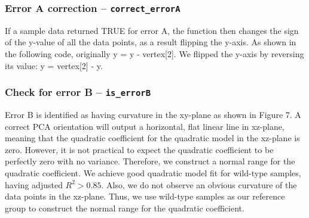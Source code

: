 \documentclass[10pt,letterpaper]{article}
\newenvironment{Shaded}{\begin{snugshade}}{\end{snugshade}}
\newcommand{\ControlFlowTok}[1]{\textcolor[rgb]{0.13,0.29,0.53}{\textbf{#1}}}
\newcommand{\DataTypeTok}[1]{\textcolor[rgb]{0.13,0.29,0.53}{#1}}
\newcommand{\DecValTok}[1]{\textcolor[rgb]{0.00,0.00,0.81}{#1}}
\newcommand{\KeywordTok}[1]{\textcolor[rgb]{0.13,0.29,0.53}{\textbf{#1}}}
\newcommand{\NormalTok}[1]{#1}
\newcommand{\OperatorTok}[1]{\textcolor[rgb]{0.81,0.36,0.00}{\textbf{#1}}}
\newcommand{\OtherTok}[1]{\textcolor[rgb]{0.56,0.35,0.01}{#1}}
\newcommand{\StringTok}[1]{\textcolor[rgb]{0.31,0.60,0.02}{#1}}
\begin{document}
\hypertarget{error-a-correction-correct_errora}{%
\subsubsection{\texorpdfstring{Error A correction --
\texttt{correct\_errorA}}{Error A correction -- correct\_errorA}}\label{error-a-correction-correct_errora}}

If a sample data returned TRUE for error A, the function then changes
the sign of the y-value of all the data points, as a result flipping the
y-axis. As shown in the following code, originally y = y -
vertex{[}2{]}. We flipped the y-axis by reversing its value: y =
vertex{[}2{]} - y.

\begin{Shaded}
\end{Shaded}

\hypertarget{check-for-error-b-is_errorb}{%
\subsubsection{\texorpdfstring{Check for error B --
\texttt{is\_errorB}}{Check for error B -- is\_errorB}}\label{check-for-error-b-is_errorb}}

Error B is identified as having curvature in the xy-plane as shown in
Figure 7. A correct PCA orientation will output a horizontal, flat
linear line in xz-plane, meaning that the quadratic coefficient for the
quadratic model in the xz-plane is zero. However, it is not practical to
expect the quadratic coefficient to be perfectly zero with no variance.
Therefore, we construct a normal range for the quadratic coefficient. We
achieve good quadratic model fit for wild-type samples, having adjusted
\(R^2 > 0.85\). Also, we do not observe an obvious curvature of the data
points in the xz-plane. Thus, we use wild-type samples as our reference
group to construct the normal range for the quadratic coefficient.
\end{document}
